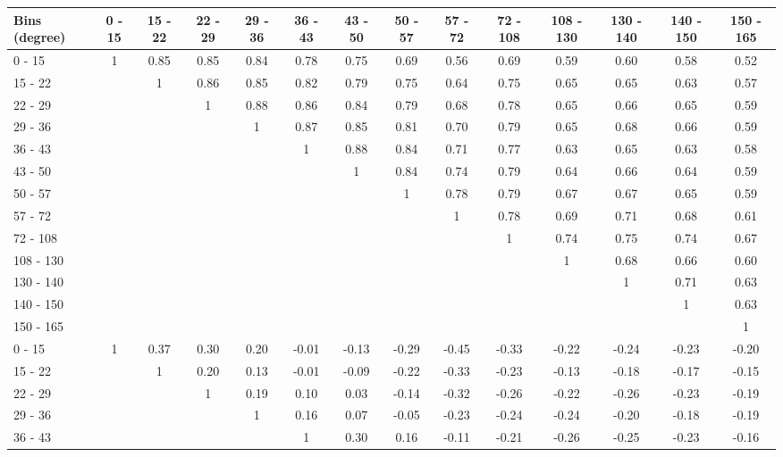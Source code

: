 \begingroup
\squeezetable
\begin{table}[h]
\begin{tabular}{l|ccccccccccccc}
\hline\hline
Bins (degree) & 0 - 15 & 15 - 22 & 22 - 29 & 29 - 36 & 36 - 43 & 43 - 50 & 50 - 57 & 57 - 72 & 72 - 108 & 108 - 130 & 130 - 140 & 140 - 150 & 150 - 165 \\ 
\hline
0 - 15 & 1 & 0.85 & 0.85 & 0.84 & 0.78 & 0.75 & 0.69 & 0.56 & 0.69 & 0.59 & 0.60 & 0.58 & 0.52 \\ 
15 - 22 &  & 1 & 0.86 & 0.85 & 0.82 & 0.79 & 0.75 & 0.64 & 0.75 & 0.65 & 0.65 & 0.63 & 0.57 \\ 
22 - 29 &  &  & 1 & 0.88 & 0.86 & 0.84 & 0.79 & 0.68 & 0.78 & 0.65 & 0.66 & 0.65 & 0.59 \\ 
29 - 36 &  &  &  & 1 & 0.87 & 0.85 & 0.81 & 0.70 & 0.79 & 0.65 & 0.68 & 0.66 & 0.59 \\ 
36 - 43 &  &  &  &  & 1 & 0.88 & 0.84 & 0.71 & 0.77 & 0.63 & 0.65 & 0.63 & 0.58 \\ 
43 - 50 &  &  &  &  &  & 1 & 0.84 & 0.74 & 0.79 & 0.64 & 0.66 & 0.64 & 0.59 \\ 
50 - 57 &  &  &  &  &  &  & 1 & 0.78 & 0.79 & 0.67 & 0.67 & 0.65 & 0.59 \\ 
57 - 72 &  &  &  &  &  &  &  & 1 & 0.78 & 0.69 & 0.71 & 0.68 & 0.61 \\ 
72 - 108 &  &  &  &  &  &  &  &  & 1 & 0.74 & 0.75 & 0.74 & 0.67 \\ 
108 - 130 &  &  &  &  &  &  &  &  &  & 1 & 0.68 & 0.66 & 0.60 \\ 
130 - 140 &  &  &  &  &  &  &  &  &  &  & 1 & 0.71 & 0.63 \\ 
140 - 150 &  &  &  &  &  &  &  &  &  &  &  & 1 & 0.63 \\ 
150 - 165 &  &  &  &  &  &  &  &  &  &  &  &  & 1 \\ 
\hline
0 - 15 & 1 & 0.37 & 0.30 & 0.20 & -0.01 & -0.13 & -0.29 & -0.45 & -0.33 & -0.22 & -0.24 & -0.23 & -0.20 \\ 
15 - 22 &  & 1 & 0.20 & 0.13 & -0.01 & -0.09 & -0.22 & -0.33 & -0.23 & -0.13 & -0.18 & -0.17 & -0.15 \\ 
22 - 29 &  &  & 1 & 0.19 & 0.10 & 0.03 & -0.14 & -0.32 & -0.26 & -0.22 & -0.26 & -0.23 & -0.19 \\ 
29 - 36 &  &  &  & 1 & 0.16 & 0.07 & -0.05 & -0.23 & -0.24 & -0.24 & -0.20 & -0.18 & -0.19 \\ 
36 - 43 &  &  &  &  & 1 & 0.30 & 0.16 & -0.11 & -0.21 & -0.26 & -0.25 & -0.23 & -0.16 \\ 

\end{tabular}
\end{table}
